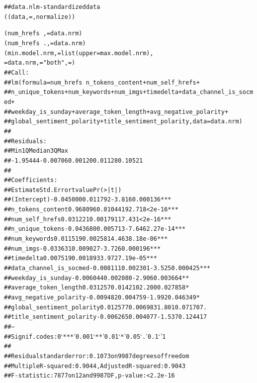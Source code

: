 \begin{knitrout}
\color{fgcolor}\begin{kframe}
\begin{alltt}
## data.nlm - standardized data
 \hlkwb{<-} ((data,  = , normalize))

 \hlkwb{<-} (num_hrefs~,  =data.nrm)
 \hlkwb{<-} (num_hrefs~., =data.nrm)
 \hlkwb{<-} (min.model.nrm,   = list(upper=max.model.nrm), 
 = data.nrm,  = "both",  = )
## Call:
## lm(formula = num_hrefs ~ n_tokens_content + num_self_hrefs + 
##     n_unique_tokens + num_keywords + num_imgs + timedelta + data_channel_is_socmed + 
##     weekday_is_sunday + average_token_length + avg_negative_polarity + 
##     global_sentiment_polarity + title_sentiment_polarity, data = data.nrm)
## 
## Residuals:
##      Min       1Q   Median       3Q      Max 
## -1.95444 -0.00706  0.00120  0.01128  0.10521 
## 
## Coefficients:
##                            Estimate Std. Error t value Pr(>|t|)    
## (Intercept)               -0.045000   0.011792  -3.816 0.000136 ***
## n_tokens_content           0.968096   0.010441  92.718  < 2e-16 ***
## num_self_hrefs             0.031221   0.001791  17.431  < 2e-16 ***
## n_unique_tokens           -0.043680   0.005713  -7.646 2.27e-14 ***
## num_keywords               0.011519   0.002581   4.463 8.18e-06 ***
## num_imgs                  -0.033631   0.009027  -3.726 0.000196 ***
## timedelta                  0.007519   0.001893   3.972 7.19e-05 ***
## data_channel_is_socmed    -0.008111   0.002301  -3.525 0.000425 ***
## weekday_is_sunday         -0.006044   0.002080  -2.906 0.003664 ** 
## average_token_length       0.031257   0.014210   2.200 0.027858 *  
## avg_negative_polarity     -0.009482   0.004759  -1.992 0.046349 *  
## global_sentiment_polarity  0.012577   0.006983   1.801 0.071707 .  
## title_sentiment_polarity  -0.006265   0.004077  -1.537 0.124417    
## ---
## Signif. codes:  0 ‘***’ 0.001 ‘**’ 0.01 ‘*’ 0.05 ‘.’ 0.1 ‘ ’ 1
## 
## Residual standard error: 0.1073 on 9987 degrees of freedom
## Multiple R-squared:  0.9044,	Adjusted R-squared:  0.9043 
## F-statistic:  7877 on 12 and 9987 DF,  p-value: < 2.2e-16
\end{alltt}
\end{kframe}
\end{knitrout}

